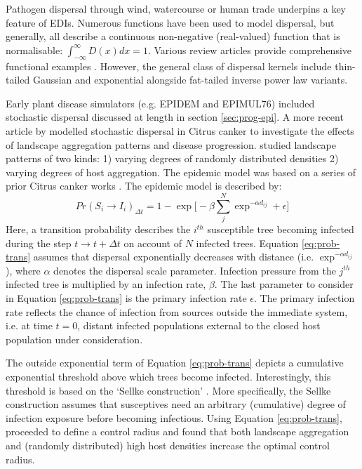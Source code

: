 Pathogen dispersal through wind, watercourse or human trade underpins a key feature of EDIs. 
Numerous functions have been used to model dispersal, but generally, all describe a continuous 
non-negative (real-valued) function that is normalisable: $\int_{-\infty}^{\infty}  D(x)dx = 1$.
Various review articles provide comprehensive functional examples \cite{bullock2017synthesis, nathan2012dispersal, howe1982ecology}.
However, the general class of dispersal kernels include thin-tailed Gaussian and 
exponential alongside fat-tailed inverse power law variants.

Early plant disease simulators (e.g. EPIDEM and EPIMUL76) included stochastic dispersal\textemdash 
discussed at length in section \ref{sec:prog-epi}. A more recent article by \cite{parnell2010effect} 
modelled stochastic dispersal in Citrus canker to investigate the effects of landscape aggregation 
patterns and disease progression.
\cite{parnell2010effect} studied landscape patterns of two kinds: 
1) varying degrees of randomly distributed densities 
2) varying degrees of host aggregation.
The epidemic model was based on a series of prior Citrus canker works
\cite{parnell2009optimal, gilligan2008epidemiological, cook2008constructing}.
The epidemic model is described by:
\begin{equation}
\label{eq:prob-trans}
    Pr(S_i \rightarrow I_i)_{\Delta t} = 1 - \exp\big[- \beta \sum_j^N\exp^{-\alpha d_{ij}} + \epsilon \big]
\end{equation}
Here, a transition probability describes the $i^{th}$ susceptible tree becoming infected 
during the step $t \rightarrow t + \Delta t$ on account of $N$ infected trees.
Equation \ref{eq:prob-trans} assumes that dispersal exponentially decreases with distance (i.e. $\exp^{-\alpha d_{ij}}$), 
where $\alpha$ denotes the dispersal scale parameter. Infection pressure from the $j^{th}$ infected tree is multiplied by an
infection rate, $\beta$. The last parameter to consider in Equation \ref{eq:prob-trans}
is the primary infection rate $\epsilon$. The primary infection rate reflects the chance of infection from sources outside
the immediate system, i.e. at time $t=0$, distant infected populations external to the
closed host population under consideration.

The outside exponential term of Equation \ref{eq:prob-trans} depicts a cumulative exponential threshold above which 
trees become infected. Interestingly, this threshold is based on the `Sellke construction'  \cite{sellke1983asymptotic}. 
More specifically, the Sellke construction assumes that susceptives need an arbitrary (cumulative) degree of infection
exposure before becoming infectious. Using Equation \ref{eq:prob-trans}, \cite{parnell2010effect} proceeded to define 
a control radius and found that both landscape aggregation and (randomly distributed) high host densities increase the
optimal control radius. 

